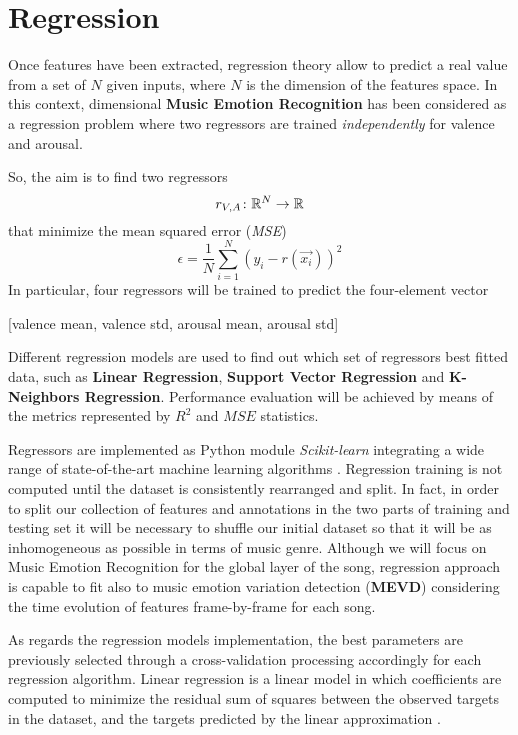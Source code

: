 \section{Regression} %
Once features have been extracted, regression theory allow to predict a real value from a set of $N$ given inputs, where $N$ is the dimension of the features space. In this context, dimensional \textbf{Music Emotion Recognition} has been considered as a regression problem where two regressors are trained \textit{independently} for valence and arousal. 

So, the aim is to find two regressors  
\[r_{V, A} \colon \mathbb{R}^{N} \to \mathbb{R}\]
that minimize the mean squared error (\textit{MSE})
\[ \epsilon = \frac{1}{N} \sum_{i =1}^{N} (y_i - r(\vec{x_i}))^2\]
In particular, four regressors will be trained to predict the four-element vector
\begin{center}
[valence mean, valence std, arousal mean, arousal std]
\end{center}

Different regression models are used to find out which set of regressors best fitted data, such as \textbf{Linear Regression}, \textbf{Support Vector Regression} and \textbf{K-Neighbors Regression}. Performance evaluation will be achieved by means of the metrics represented by $R^2$ and $MSE$ statistics.

Regressors are implemented as Python module \textit{Scikit-learn} integrating a wide range of state-of-the-art machine learning algorithms \cite{scikit-learn}. Regression training is not computed until the dataset is consistently rearranged and split. In fact, in order to split our collection of features and annotations in the two parts of training and testing set it will be necessary to shuffle our initial dataset so that it will be as inhomogeneous as possible in terms of music genre. Although we will focus on Music Emotion Recognition for the global layer of the song, regression approach is capable to fit also to music emotion variation detection (\textbf{MEVD}) considering the time evolution of features frame-by-frame for each song.

As regards the regression models implementation, the best parameters are previously selected through a cross-validation processing accordingly for each regression algorithm. Linear regression is a linear model in which coefficients are computed to minimize the residual sum of squares between the observed targets in the dataset, and the targets predicted by the linear approximation \cite{scikit-learn}. 

